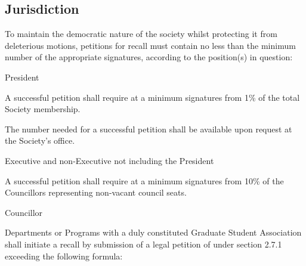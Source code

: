 \subsection{Jurisdiction}
To maintain the democratic nature of the society whilst protecting it from deleterious motions, petitions for recall must contain no less than the minimum number of the appropriate signatures, according to the position(s) in question:

\begin{longenum}[ label*=\thesubsection.\arabic*., align=left]
	\item President
    \begin{longenum}[ label*=\arabic*., align=left]
		\item A successful petition shall require at a minimum signatures from 1\% of the total Society membership.
    	\begin{longenum}[ label*=\arabic*., align=left]
			\item The number needed for a successful petition shall be available upon request at the Society's office.
		\end{longenum}
	\end{longenum}
   \item Executive and non-Executive not including the President
    \begin{longenum}[ label*=\arabic*., align=left]
		\item A successful petition shall require at a minimum signatures from 10\% of the Councillors representing non-vacant council seats.
	\end{longenum}
	\item Councillor
    \begin{longenum}[ label*=\arabic*., align=left]
		\item Departments or Programs with a duly constituted Graduate Student Association shall initiate a recall by submission of a legal petition of under section 2.7.1 exceeding the following formula: \newline
        

\end{longenum}
\end{longenum}
